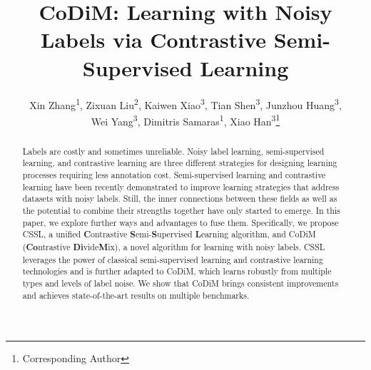 \documentclass[letterpaper]{article} \usepackage{aaai22}  \usepackage{times}  \usepackage{helvet}  \usepackage{courier}  \usepackage[hyphens]{url}  \usepackage{graphicx} \usepackage{subfigure}
\title{CoDiM: Learning with Noisy Labels via Contrastive Semi-Supervised Learning}
\author{
    Xin Zhang\textsuperscript{\rm 1}\equalcontrib,
    Zixuan Liu\textsuperscript{\rm 2}\equalcontrib, 
    Kaiwen Xiao\textsuperscript{\rm 3}, 
    Tian Shen\textsuperscript{\rm 3}, 
    Junzhou Huang\textsuperscript{\rm 3}, \\
    Wei Yang\textsuperscript{\rm 3}, 
    Dimitris Samaras\textsuperscript{\rm 1}, 
    Xiao Han\textsuperscript{\rm 3}\thanks{Corresponding Author}
    }
\begin{document}
\maketitle

\begin{abstract}
Labels are costly and sometimes unreliable. Noisy label learning, semi-supervised learning, and contrastive learning are three different strategies for designing learning processes requiring less annotation cost. Semi-supervised learning and contrastive learning have been recently demonstrated to improve learning strategies that address datasets with noisy labels. Still, the inner connections between these fields as well as the potential to combine their strengths together have only started to emerge. In this paper, we explore further ways and advantages to fuse them. Specifically, we propose CSSL, a unified \textbf{C}ontrastive \textbf{S}emi-\textbf{S}upervised \textbf{L}earning algorithm, and CoDiM (\textbf{Co}ntrastive \textbf{Di}vide\textbf{M}ix), a novel algorithm for learning with noisy labels. CSSL leverages the power of classical semi-supervised learning and contrastive learning technologies and is further adapted to CoDiM, which learns robustly from multiple types and levels of label noise. We show that CoDiM brings consistent improvements and achieves state-of-the-art results on multiple benchmarks.
\end{abstract}
\end{document}
